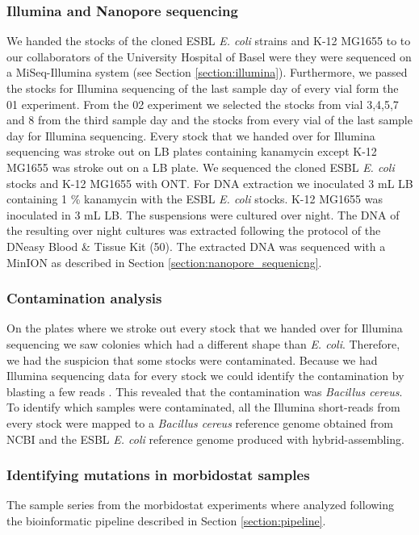\subsubsection{Illumina and Nanopore sequencing}
We handed the stocks of the cloned ESBL \textit{E. coli} strains and K-12 MG1655 to to our collaborators of the University Hospital of Basel were they were sequenced on a MiSeq-Illumina system (see Section \ref{section:illumina}).
Furthermore, we passed the stocks for Illumina sequencing of the last sample day of every vial form the 01 experiment. 
From the 02 experiment we selected the stocks from vial 3,4,5,7 and 8 from the third sample day and the stocks from every vial of the last sample day for Illumina sequencing. Every stock that we handed over for Illumina sequencing was stroke out on LB plates containing kanamycin except K-12 MG1655 was stroke out on a LB plate.
We sequenced the cloned ESBL \textit{E. coli} stocks and K-12 MG1655 with ONT. For DNA extraction we inoculated 3 mL LB containing 1 \% kanamycin with the ESBL \textit{E. coli} stocks. K-12 MG1655 was inoculated in 3 mL LB. The suspensions were cultured over night. The DNA of the resulting over night cultures was extracted following the protocol of the DNeasy Blood \& Tissue Kit (50). The extracted DNA was sequenced with a MinION as described in Section \ref{section:nanopore_sequenicng}. 

\subsubsection{Contamination analysis}
On the plates where we stroke out every stock that we handed over for Illumina sequencing we saw colonies which had a different shape than \textit{E. coli}. Therefore, we had the suspicion that some stocks were contaminated. Because we had Illumina sequencing data for every stock we could identify the contamination by blasting a few reads \cite{madden_blast_2003}. This revealed that the contamination was \textit{Bacillus cereus}. To identify which samples were contaminated, all the Illumina short-reads from every stock  were mapped to a \textit{Bacillus cereus} reference genome obtained from NCBI \cite{noauthor_bacillus_nodate} and the ESBL \textit{E. coli} reference genome produced with hybrid-assembling.

\subsubsection{Identifying mutations in morbidostat samples}
The sample series from the morbidostat experiments where analyzed following the bioinformatic pipeline described in Section \ref{section:pipeline}. 
